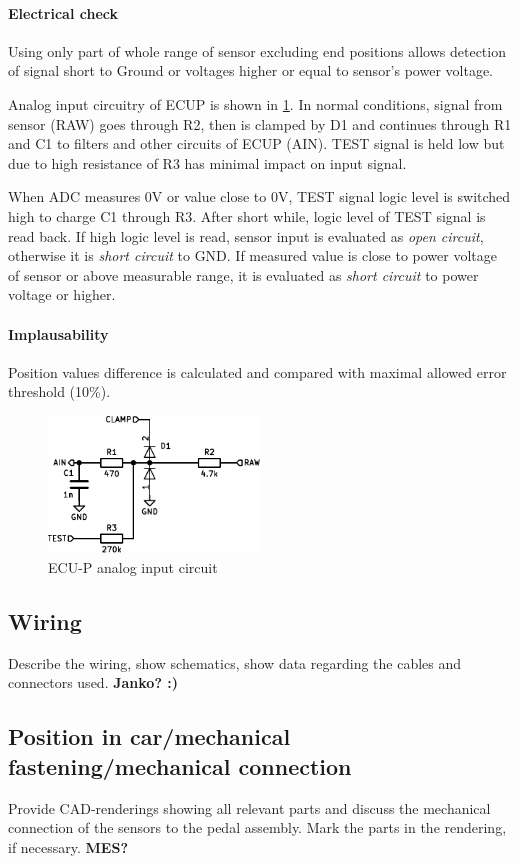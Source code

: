 \paragraph{Electrical check} 
Using only part of whole range of sensor excluding end positions allows detection of signal short to Ground or voltages higher or equal to sensor's power voltage.

Analog input circuitry of ECUP is shown in \ref{fig:ecup_analog_input}. In normal conditions, signal from sensor (RAW) goes through R2, then is clamped by D1 and continues through R1 and C1 to filters and other circuits of ECUP (AIN). TEST signal is held low but due to high resistance of R3 has minimal impact on input signal.

When ADC measures 0V or value close to 0V, TEST signal logic level is switched high to charge C1 through R3. After short while, logic level of TEST signal is read back. If high logic level is read, sensor input is evaluated as \textit{open circuit}, otherwise it is \textit{short circuit} to GND. If measured value is close to power voltage of sensor or above measurable range, it is evaluated as \textit{short circuit} to power voltage or higher.

\paragraph{Implausability}
Position values difference is calculated and compared with maximal allowed error threshold (10\%).

\begin{figure}[H]
\begin{center}
	\includegraphics[width=0.5\textwidth]{./img/ECUP_AIN.pdf}
	\caption{ECU-P analog input circuit}
	\label{fig:ecup_analog_input}
\end{center}
\end{figure}



\subsection{Wiring}
Describe the wiring, show schematics, show data regarding the cables and connectors used.
\textbf{Janko? :)}

\subsection{Position in car/mechanical fastening/mechanical connection}
Provide CAD-renderings showing all relevant parts and discuss the mechanical connection of the sensors to the pedal assembly. Mark the parts in the rendering, if necessary.
\textbf{MES?}



